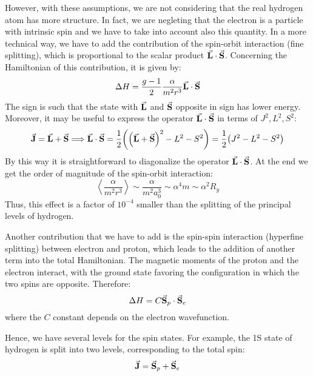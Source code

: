 \documentclass[../../main/main.tex]{subfiles}
\begin{document}
However, with these assumptions, we are not considering that the real hydrogen atom has more structure. In fact, we are negleting that the electron is a particle with intrinsic spin and we have to take into account also this quantity. In a more technical way, we have to add the contribution of the spin-orbit interaction (fine splitting), which is proportional to the scalar product \( \va{L} \cdot \va{S} \). Concerning the Hamiltonian of this contribution, it is given by:
\begin{equation}
    \Delta H
    =
    \frac{g-1}{2} \frac{\alpha}{m^2 r^3} \va{L} \cdot \va{S}
    \label{eq:L02_HASOHC}
\end{equation}
The sign is such that the state with \( \va{L} \) and \( \va{S} \) opposite in sign has lower energy. Moreover, it may be useful to express the operator \( \va{L} \cdot \va{S} \) in terms of \( J^2, L^2, S^2 \):
\begin{equation}
    \va{J} = \va{L} + \va{S}
    \Longrightarrow
    \va{L} \cdot \va{S} = \frac{1}{2} \qty(\qty(\va{L} + \va{S})^2 - L^2 - S^2)
    =
    \frac{1}{2} \qty(J^2 - L^2 - S^2)
    \label{eq:L02_HASOT}
\end{equation}
By this way it is straightforward to diagonalize the operator \( \va{L} \cdot \va{S} \). At the end we get the order of magnitude of the spin-orbit interaction:
\begin{equation}
    \left\langle \frac{\alpha}{m^2 r^3} \right\rangle
    \sim
    \frac{\alpha}{m^2 a_0^3}
    \sim
    \alpha^4 m
    \sim
    \alpha^2 R_y
    \label{eq:L02_HASOOM}
\end{equation}
Thus, this effect is a factor of \( 10^{-4} \) smaller than the splitting of the principal levels of hydrogen.

Another contribution that we have to add is the spin-spin interaction (hyperfine splitting) between electron and proton, which leads to the addition of another term into the total Hamiltonian. The magnetic moments of the proton and the electron interact, with the ground state favoring the configuration in which the two spins are opposite. Therefore:
\begin{equation}
    \Delta H
    =
    C \va{S}_p \cdot \va{S}_e
    \label{eq:L02_HASSHC}
\end{equation}
where the \( C \) constant depends on the electron wavefunction.

Hence, we have several levels for the spin states. For example, the 1S state of hydrogen is split into two levels, corresponding to the total spin:
\begin{equation}
    \va{J} = \va{S}_p + \va{S}_e
    \label{eq:L02_HATS}
\end{equation}
\end{document}
